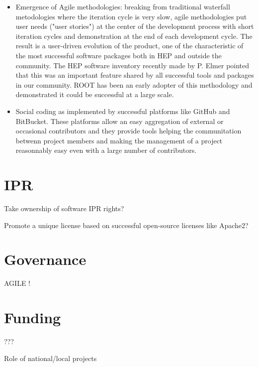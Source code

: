 \documentclass[11pt]{article} %
\begin{document}
\begin{itemize}
\item 
Emergence of Agile methodologies: breaking from traditional
waterfall metodologies where the iteration cycle is very slow, agile
methodologies put user needs ("user stories") at the center of the
development process with short iteration cycles and demonstration
at the end of each development cycle.
The result is a user-driven evolution of the product, one of the
characteristic of the most successful software packages both in HEP
and outside the community. 
The HEP software inventory recently made by P. Elmer pointed that
this was an important feature shared by all successful tools and
packages in our community. 
ROOT has been an early adopter of this methodology and demonstrated
it could be successful at a large scale.

\item 
Social coding as implemented by successful platforms like GitHub and
BitBucket.
These platforms allow an easy aggregation of external or occasional
contributors and they provide tools helping the communitation betwenn
project members and making the management of a project reasonnably
easy even with a large number of contributors.

\end{itemize}


\section{IPR}

Take ownership of software IPR rights?

Promote a unique license based on successful open-source licenses like
Apache2?

\section{Governance}

AGILE !

\section{Funding}

???

Role of national/local projects
\end{document}
